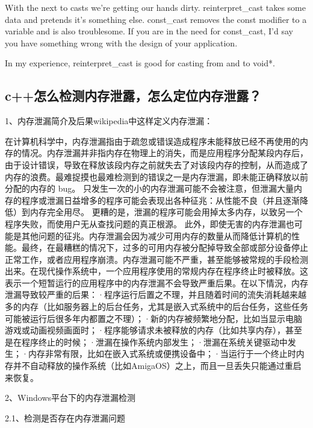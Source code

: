 With the next to casts we’re getting our hands dirty. reinterpret\_cast takes some data and pretends it’s something else. const\_cast removes the const modifier to a variable and is also troublesome. If you are in the need for const\_cast, I’d say you have something wrong with the design of your application.

In my experience, reinterpret\_cast is good for casting from and to void*.
\subsection{c++怎么检测内存泄露，怎么定位内存泄露？}
1、内存泄漏简介及后果wikipedia中这样定义内存泄漏：

在计算机科学中，内存泄漏指由于疏忽或错误造成程序未能释放已经不再使用的内存的情况。内存泄漏并非指内存在物理上的消失，而是应用程序分配某段内存后，由于设计错误，导致在释放该段内存之前就失去了对该段内存的控制，从而造成了内存的浪费。最难捉摸也最难检测到的错误之一是内存泄漏，即未能正确释放以前分配的内存的 bug。 只发生一次的小的内存泄漏可能不会被注意，但泄漏大量内存的程序或泄漏日益增多的程序可能会表现出各种征兆：从性能不良（并且逐渐降低）到内存完全用尽。 更糟的是，泄漏的程序可能会用掉太多内存，以致另一个程序失败，而使用户无从查找问题的真正根源。 此外，即使无害的内存泄漏也可能是其他问题的征兆。内存泄漏会因为减少可用内存的数量从而降低计算机的性能。最终，在最糟糕的情况下，过多的可用内存被分配掉导致全部或部分设备停止正常工作，或者应用程序崩溃。内存泄漏可能不严重，甚至能够被常规的手段检测出来。在现代操作系统中，一个应用程序使用的常规内存在程序终止时被释放。这表示一个短暂运行的应用程序中的内存泄漏不会导致严重后果。在以下情況，内存泄漏导致较严重的后果：·程序运行后置之不理，并且随着时间的流失消耗越来越多的内存（比如服务器上的后台任务，尤其是嵌入式系统中的后台任务，这些任务可能被运行后很多年内都置之不理）；·新的内存被频繁地分配，比如当显示电脑游戏或动画视频画面时；·程序能够请求未被释放的内存（比如共享内存），甚至是在程序终止的时候；·泄漏在操作系统内部发生；·泄漏在系统关键驱动中发生；·内存非常有限，比如在嵌入式系统或便携设备中；·当运行于一个终止时内存并不自动释放的操作系统（比如AmigaOS）之上，而且一旦丢失只能通过重启来恢复。

2、Windows平台下的内存泄漏检测

2.1、检测是否存在内存泄漏问题

